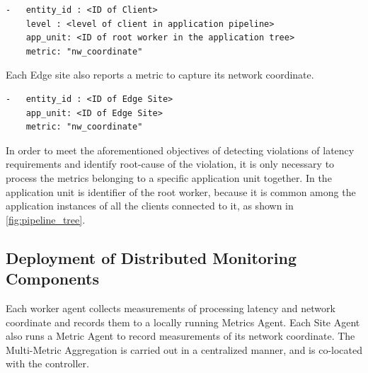 \begin{verbatim}
-   entity_id : <ID of Client>
    level : <level of client in application pipeline>
    app_unit: <ID of root worker in the application tree>
    metric: "nw_coordinate"
\end{verbatim}
\par \noindent  Each Edge site also reports a metric to capture its network coordinate.
\begin{verbatim}
-   entity_id : <ID of Edge Site>
    app_unit: <ID of Edge Site>
    metric: "nw_coordinate"
\end{verbatim}

In order to meet the aforementioned objectives of detecting violations of latency requirements and identify root-cause of the violation, it is only necessary to process the metrics belonging to a specific application unit together. In \oneedge{} the application unit is identifier of the root worker, because it is common among the application instances of all the clients connected to it, as shown in \cref{fig:pipeline_tree}.

\subsection{Deployment of Distributed Monitoring Components}
Each worker agent collects measurements of processing latency and network coordinate and records them to a locally running Metrics Agent. Each Site Agent also runs a Metric Agent to record measurements of its network coordinate. The Multi-Metric Aggregation is carried out in a centralized manner, and is co-located with the controller.


